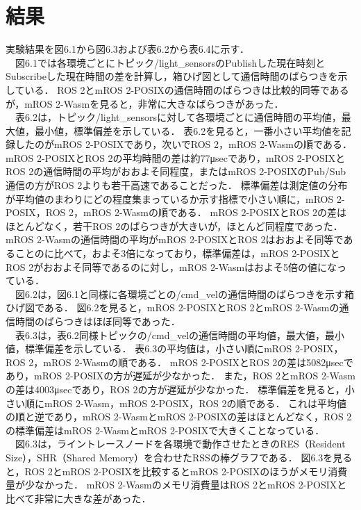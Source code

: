 \section{結果}
実験結果を図6.1から図6.3および表6.2から表6.4に示す．
\\　図6.1では各環境ごとにトピック/light\_sensorsのPublishした現在時刻とSubscribeした現在時間の差を計算し，箱ひげ図として通信時間のばらつきを示している．
ROS 2とmROS 2-POSIXの通信時間のばらつきは比較的同等であるが，mROS 2-Wasmを見ると，非常に大きなばらつきがあった．
\\　表6.2は，トピック/light\_sensorsに対して各環境ごとに通信時間の平均値，最大値，最小値，標準偏差を示している．
表6.2を見ると，一番小さい平均値を記録したのがmROS 2-POSIXであり，次いでROS 2，mROS 2-Wasmの順である．
mROS 2-POSIXとROS 2の平均時間の差は約77μsecであり，mROS 2-POSIXとROS 2の通信時間の平均がおおよそ同程度，またはmROS 2-POSIXのPub/Sub通信の方がROS 2よりも若干高速であることだった．
標準偏差は測定値の分布が平均値のまわりにどの程度集まっているか示す指標で小さい順に，mROS 2-POSIX，ROS 2，mROS 2-Wasmの順である．
mROS 2-POSIXとROS 2の差はほとんどなく，若干ROS 2のばらつきが大きいが，ほとんど同程度であった．
mROS 2-Wasmの通信時間の平均がmROS 2-POSIXとROS 2はおおよそ同等であることのに比べて，およそ3倍になっており，標準偏差は，mROS 2-POSIXとROS 2がおおよそ同等であるのに対し，mROS 2-Wasmはおよそ5倍の値になっている．
\\　図6.2は，図6.1と同様に各環境ごとの/cmd\_velの通信時間のばらつきを示す箱ひげ図である．
図6.2を見ると，mROS 2-POSIXとROS 2とmROS 2-Wasmの通信時間のばらつきはほぼ同等であった．
\\　表6.3は，表6.2同様トピックの/cmd\_velの通信時間の平均値，最大値，最小値，標準偏差を示している．
表6.3の平均値は，小さい順にmROS 2-POSIX，ROS 2，mROS 2-Wasmの順である．
mROS 2-POSIXとROS 2の差は5082μsecであり，mROS 2-POSIXの方が遅延が少なかった．
また，ROS 2とmROS 2-Wasmの差は4003μsecであり，ROS 2の方が遅延が少なかった．
標準偏差を見ると，小さい順にmROS 2-Wasm，mROS 2-POSIX，ROS 2の順である．
これは平均値の順と逆であり，mROS 2-WasmとmROS 2-POSIXの差はほとんどなく，ROS 2の標準偏差はmROS 2-WasmとmROS 2-POSIXで大きくことなっている．
\\　図6.3は，ライントレースノードを各環境で動作させたときのRES（Resident Size），SHR（Shared Memory）を合わせたRSSの棒グラフである．
図6.3を見ると，ROS 2とmROS 2-POSIXを比較するとmROS 2-POSIXのほうがメモリ消費量が少なかった．
mROS 2-Wasmのメモリ消費量はROS 2とmROS 2-POSIXと比べて非常に大きな差があった．
